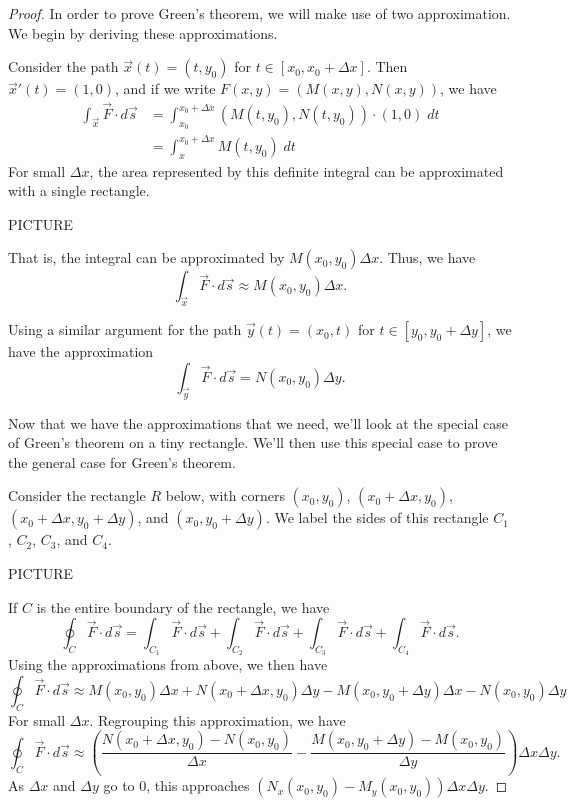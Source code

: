 \documentclass{ximera}
\begin{document}
\begin{proof}
In order to prove Green's theorem, we will make use of two approximation. We begin by deriving these approximations.

Consider the path $\vec{x}(t) = (t,y_0)$ for $t\in[x_0, x_0+\Delta x]$. Then $\vec{x}'(t) = (1,0)$, and if we write $F(x,y) = (M(x,y), N(x,y))$, we have
\begin{align*}
\int_{\vec{x}}\vec{F}\cdot d\vec{s} &= \int_{x_0}^{x_0+\Delta x} (M(t,y_0), N(t,y_0))\cdot (1,0)\;dt\\
&= \int_x^{x_0+\Delta x} M(t,y_0)\;dt
\end{align*}
For small $\Delta x$, the area represented by this definite integral can be approximated with a single rectangle.

PICTURE

That is, the integral can be approximated by $M(x_0,y_0)\Delta x$. Thus, we have
\[
\int_{\vec{x}}\vec{F}\cdot d\vec{s}\approx M(x_0,y_0)\Delta x.
\]

Using a similar argument for the path $\vec{y}(t) = (x_0, t)$ for $t\in[y_0, y_0+\Delta y]$, we have the approximation
\[
\int_{\vec{y}}\vec{F}\cdot d\vec{s} = N(x_0, y_0)\Delta y.
\]

Now that we have the approximations that we need, we'll look at the special case of Green's theorem on a tiny rectangle. We'll then use this special case to prove the general case for Green's theorem.

Consider the rectangle $R$ below, with corners $(x_0, y_0)$, $(x_0+\Delta x, y_0)$, $(x_0+\Delta x, y_0+\Delta y)$, and $(x_0, y_0+\Delta y)$. We label the sides of this rectangle $C_1$, $C_2$, $C_3$, and $C_4$.

PICTURE

If $C$ is the entire boundary of the rectangle, we have
\[
\oint_C\vec{F}\cdot d\vec{s} = \int_{C_1}\vec{F}\cdot d\vec{s} + \int_{C_2}\vec{F}\cdot d\vec{s} + \int_{C_3}\vec{F}\cdot d\vec{s} + \int_{C_4}\vec{F}\cdot d\vec{s}.
\]
Using the approximations from above, we then have
\[
\oint_C\vec{F}\cdot d\vec{s} \approx M(x_0,y_0)\Delta x + N(x_0+\Delta x, y_0)\Delta y - M(x_0, y_0+\Delta y)\Delta x - N(x_0,y_0)\Delta y
\]
For small $\Delta x$. Regrouping this approximation, we have
\[
\oint_C\vec{F}\cdot d\vec{s} \approx \left(\frac{N(x_0+\Delta x, y_0) - N(x_0, y_0)}{\Delta x} - \frac{M(x_0, y_0+\Delta y) - M(x_0,y_0)}{\Delta y}\right)\Delta x\Delta y.
\]
As $\Delta x$ and $\Delta y$ go to $0$, this approaches $\left(N_x(x_0,y_0)-M_y(x_0,y_0)\right) \Delta x\Delta y$.


\end{proof}
\end{document}
